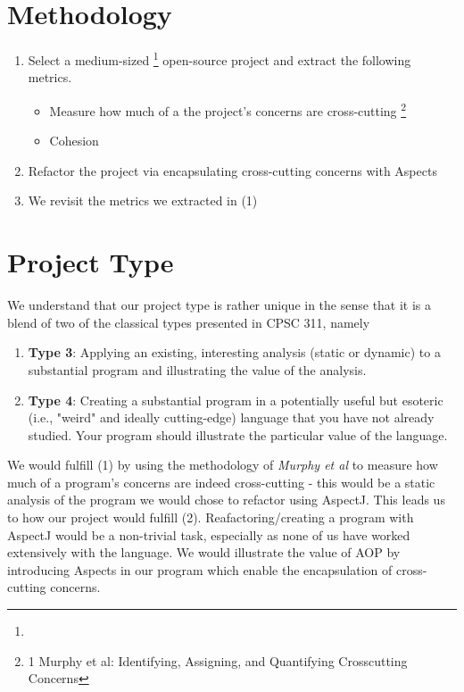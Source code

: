 \documentclass[sigconf]{acmart}
\begin{document}
\section{Methodology}
\begin{enumerate}
    \item Select a medium-sized \footnote{ } open-source project and extract the following metrics.
    \begin{itemize}
    \item Measure how much of a the project's concerns are cross-cutting \footnote{1 Murphy et al: Identifying, Assigning, and Quantifying Crosscutting Concerns}
    \item Cohesion
\end{itemize}
    \item Refactor the project via encapsulating cross-cutting concerns with Aspects
    \item We revisit the metrics we extracted in (1)
\end{enumerate}

\section{Project Type}
We understand that our project type is rather unique in the sense that it is a blend of two of the classical types presented in CPSC 311, namely
\begin{enumerate}
    \item \textbf{Type 3}: Applying an existing, interesting analysis (static or dynamic) to a substantial program and illustrating the value of the analysis.
    \item \textbf{Type 4}: Creating a substantial program in a potentially useful but esoteric (i.e., "weird" and ideally cutting-edge) language that you have not already studied. Your program should illustrate the particular value of the language.
\end{enumerate}
We would fulfill (1) by using the methodology of \textit{Murphy et al} to measure how much of a program's concerns are indeed cross-cutting - this would be a static analysis of the program we would chose to refactor using AspectJ. This leads us to how our project would fulfill (2). Reafactoring/creating a program with AspectJ would be a non-trivial task, especially as none of us have worked extensively with the language. We would illustrate the value of AOP by introducing Aspects in our program which enable the encapsulation of cross-cutting concerns.
\end{document}
